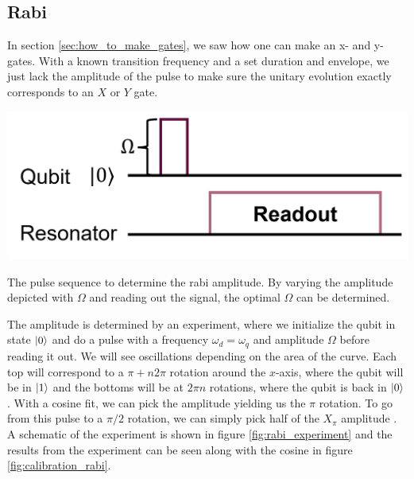 \subsection{Rabi}
In section \ref{sec:how_to_make_gates}, we saw how one can make an x- and y-gates. With a known transition frequency and a set duration and envelope, we just lack the amplitude of the pulse to make sure the unitary evolution exactly corresponds to an $X$ or $Y$ gate. 
\begin{marginfigure}[5 cm]
    \centering
    \includegraphics[]{Figs/circuits/rabi.png}
    \caption{The pulse sequence to determine the rabi amplitude. By varying the amplitude depicted with $\Omega$ and reading out the signal, the optimal $\Omega$ can be determined.}
    \label{fig:rabi_experiment}
\end{marginfigure}
The amplitude is determined by an experiment, where we initialize the qubit in state $\ket{0}$ and do a pulse with a frequency $\omega_d = \omega_q$ and amplitude $\Omega$ before reading it out. We will see oscillations depending on the area of the curve. Each top will correspond to a $\pi +n2\pi$ rotation around the $x$-axis, where the qubit will be in $\ket{1}$ and the bottoms will be at $2\pi n$ rotations, where the qubit is back in $\ket{0}$. With a cosine fit, we can pick the amplitude yielding us the $\pi$ rotation. To go from this pulse to a $\pi/2$ rotation, we can simply pick half of the $X_{\pi}$ amplitude \cite{Naglihou}. A schematic of the experiment is shown in figure \ref{fig:rabi_experiment} and the results from the experiment can be seen along with the cosine in figure \ref{fig:calibration_rabi}.
